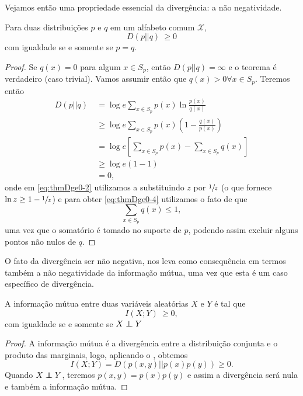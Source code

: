Vejamos então uma propriedade essencial da divergência: a não negatividade.
\begin{theorem}\label{thm-divnn}
Para duas distribuições $p$ e $q$ em um alfabeto comum $\mathcal{X}$,
\begin{equation}
D(p||q) \: \geq 0 
\end{equation}
com igualdade se e somente se $p=q$.
\end{theorem}
\begin{proof}
Se $q(x) = 0$ para algum $x \in S_p$, então $D(p||q) = \infty$ e o teorema é verdadeiro
(caso trivial).
Vamos assumir então que $q(x) > 0 \forall x \in S_p$. Teremos então
\begin{subequations}\label{eq:thmDge0}
\begin{align}
 D(p||q) \: &= \log e \sum_{x \in S_p} p(x) \ln \frac{p(x)}{q(x)} \\
   &\geq \log e \sum_{x \in S_p} p(x) \left( 1 - \frac{q(x)}{p(x)} \right) \label{eq:thmDge0-2} \\
   &= \log e \left[ \sum_{x \in S_p} p(x) - \sum_{x \in S_p} q(x) \right] \\
   &\geq \log e (1 - 1) \label{eq:thmDge0-4}\\
   &= 0 ,
\end{align}
\end{subequations}
onde em \ref{eq:thmDge0-2} utilizamos a  substituindo $z$ por $\sfrac{1}{z}$ 
(o que fornece $\ln z \geq 1 - \sfrac{1}{z}$) e para obter \ref{eq:thmDge0-4} utilizamos o fato
de que
\begin{equation}
 \sum_{x \in S_p} q(x) \leq 1 ,
\end{equation}
uma vez que o somatório é tomado no suporte de $p$, podendo assim excluir alguns pontos não nulos de $q$.
\end{proof}

O fato da divergência ser não negativa, nos leva como consequência em termos
também a não negatividade da informação mútua, uma vez que esta é um caso específico
de divergência.
\begin{lemma}
A informação mútua entre duas variáveis aleatórias $X$ e $Y$ é tal que
\begin{equation}
 I(X;Y) \: \geq 0 ,
\end{equation}
com igualdade se e somente se $X \independent Y$
\end{lemma}
\begin{proof}
A informação mútua é a divergência entre a distribuição conjunta e o produto das marginais, logo,
aplicando o , obtemos
\begin{equation}
 I(X;Y) = D(p(x,y)||p(x)p(y)) \geq 0 .
\end{equation}
Quando $X \independent Y$, teremos $p(x,y) = p(x)p(y)$ e assim a divergência será nula
e também a informação mútua.
\end{proof}

